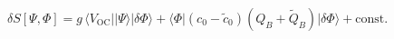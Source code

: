 \begin{equation} %
  \delta S[\Psi,\Phi] = 
g\,\langle V_{\text{OC}}|| \Psi \rangle| \delta \Phi \rangle 
+\langle \Phi| (c_0 -\tilde{c}_0) (Q_B +\tilde{Q}_B)|\delta\Phi\rangle
+ \text{const.}
\end{equation} 
